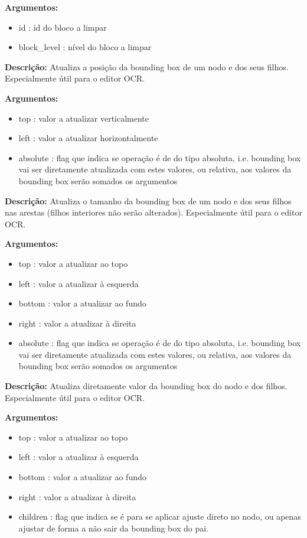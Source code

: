 \textbf{Argumentos:}
\begin{itemize}\setlength\itemsep{-0.3em}
	\item id : id do bloco a limpar
	\item block\_level : nível do bloco a limpar
\end{itemize}


\textbf{Descrição:} Atualiza a posição da bounding box de um nodo e dos seus filhos. Especialmente útil para o editor OCR.


\textbf{Argumentos:}
\begin{itemize}\setlength\itemsep{-0.3em}
	\item top : valor a atualizar verticalmente
	\item left : valor a atualizar horizontalmente
	\item absolute : flag que indica se operação é de do tipo absoluta, i.e. bounding box vai ser diretamente atualizada com estes valores, ou relativa, aos valores da bounding box serão somados os argumentos
\end{itemize}


\textbf{Descrição:} Atualiza o tamanho da bounding box de um nodo e dos seus filhos nas arestas (filhos interiores não serão alterados). Especialmente útil para o editor OCR.


\textbf{Argumentos:}
\begin{itemize}\setlength\itemsep{-0.3em}
	\item top : valor a atualizar ao topo
	\item left : valor a atualizar à esquerda
	\item bottom : valor a atualizar ao fundo
	\item right : valor a atualizar à direita
	\item absolute : flag que indica se operação é de do tipo absoluta, i.e. bounding box vai ser diretamente atualizada com estes valores, ou relativa, aos valores da bounding box serão somados os argumentos
\end{itemize}


\textbf{Descrição:} Atualiza diretamente valor da bounding box do nodo e dos filhos. Especialmente útil para o editor OCR.

\textbf{Argumentos:}
\begin{itemize}\setlength\itemsep{-0.3em}
	\item top : valor a atualizar ao topo
	\item left : valor a atualizar à esquerda
	\item bottom : valor a atualizar ao fundo
	\item right : valor a atualizar à direita
	\item children : flag que indica se é para se aplicar ajuste direto no nodo, ou apenas ajustar de forma a não sair da bounding box do pai.
\end{itemize}

